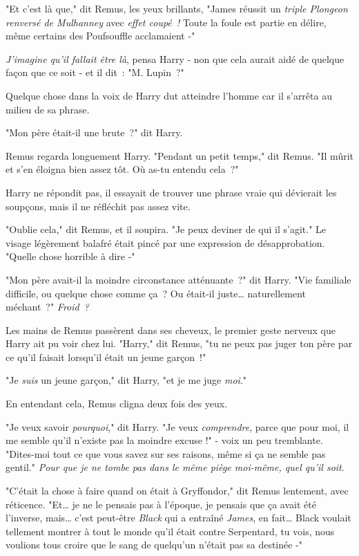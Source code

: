 "Et c'est là que," dit Remus, les yeux brillants, "James réussit un \emph{triple Plongeon renversé de Mulhanney} avec \emph{effet coupé~!} Toute la foule est partie en délire, même certains des Poufsouffle acclamaient -"

\emph{J'imagine qu'il fallait être là}, pensa Harry - non que cela aurait aidé de quelque façon que ce soit - et il dit~: "M. Lupin~?"

Quelque chose dans la voix de Harry dut atteindre l'homme car il s'arrêta au milieu de sa phrase.

"Mon père était-il une brute~?" dit Harry.

Remus regarda longuement Harry. "Pendant un petit temps," dit Remus. "Il mûrit et s'en éloigna bien assez tôt. Où as-tu entendu cela~?"

Harry ne répondit pas, il essayait de trouver une phrase vraie qui dévierait les soupçons, mais il ne réfléchit pas assez vite.

"Oublie cela," dit Remus, et il soupira. "Je peux deviner de qui il s'agit." Le visage légèrement balafré était pincé par une expression de désapprobation. "Quelle chose horrible à dire -"

"Mon père avait-il la moindre circonstance atténuante~?" dit Harry. "Vie familiale difficile, ou quelque chose comme ça~? Ou était-il juste… naturellement méchant~?" \emph{Froid~?}

Les mains de Remus passèrent dans ses cheveux, le premier geste nerveux que Harry ait pu voir chez lui. "Harry," dit Remus, "tu ne peux pas juger ton père par ce qu'il faisait lorsqu'il était un jeune garçon~!"

"Je \emph{suis} un jeune garçon," dit Harry, "et je me juge \emph{moi}."

En entendant cela, Remus cligna deux fois des yeux.

"Je veux savoir \emph{pourquoi}," dit Harry. "Je veux \emph{comprendre}, parce que pour moi, il me semble qu'il n'existe pas la moindre excuse !" - voix un peu tremblante. "Dites-moi tout ce que vous savez sur ses raisons, même si ça ne semble pas gentil." \emph{Pour que je ne tombe pas dans le même piège moi-même, quel qu'il soit}.

"C'était la chose à faire quand on était à Gryffondor," dit Remus lentement, avec réticence. "Et… je ne le pensais pas à l'époque, je pensais que ça avait été l'inverse, mais… c'est peut-être \emph{Black} qui a entraîné \emph{James}, en fait… Black voulait tellement montrer à tout le monde qu'il était contre Serpentard, tu vois, nous voulions tous croire que le sang de quelqu'un n'était pas sa destinée -"

